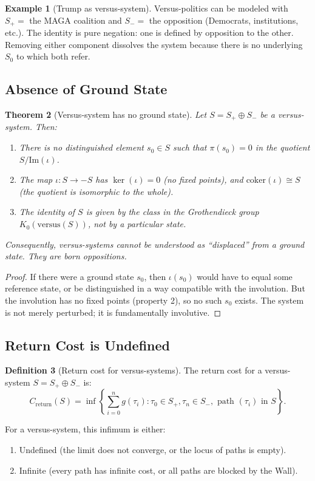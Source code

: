 \documentclass[12pt]{article}
\newtheorem{theorem}{Theorem}[section]
\theoremstyle{definition}
\newtheorem{definition}[theorem]{Definition}
\newtheorem{example}[theorem]{Example}
\theoremstyle{remark}
\begin{document}
\begin{example}[Trump as versus-system]
Versus-politics can be modeled with $S_+ = $ the MAGA coalition and $S_- = $ the opposition (Democrats, institutions, etc.). The identity is pure negation: one is defined by opposition to the other. Removing either component dissolves the system because there is no underlying $S_0$ to which both refer.
\end{example}

\subsection{Absence of Ground State}

\begin{theorem}[Versus-system has no ground state]
\label{thm:versus-no-ground}
Let $S = S_+ \oplus S_-$ be a versus-system. Then:
\begin{enumerate}
\item There is no distinguished element $s_0 \in S$ such that $\pi(s_0) = 0$ in the quotient $S / \text{Im}(\iota)$.
\item The map $\iota : S \to -S$ has $\ker(\iota) = 0$ (no fixed points), and $\mathrm{coker}(\iota) \cong S$ (the quotient is isomorphic to the whole).
\item The identity of $S$ is given by the class in the Grothendieck group $K_0(\mathrm{versus}(S))$, not by a particular state.
\end{enumerate}
Consequently, versus-systems cannot be understood as ``displaced'' from a ground state. They are born oppositions.
\end{theorem}

\begin{proof}
If there were a ground state $s_0$, then $\iota(s_0)$ would have to equal some reference state, or be distinguished in a way compatible with the involution. But the involution has no fixed points (property 2), so no such $s_0$ exists. The system is not merely perturbed; it is fundamentally involutive.
\end{proof}

\subsection{Return Cost is Undefined}

\begin{definition}[Return cost for versus-systems]
The return cost for a versus-system $S = S_+ \oplus S_-$ is:
\[
C_{\text{return}}(S) = \inf \left\{ \sum_{i=0}^n g(\tau_i) : \tau_0 \in S_+, \tau_n \in S_-, \text{ path } (\tau_i) \text{ in } S \right\}.
\]

For a versus-system, this infimum is either:
\begin{enumerate}
\item Undefined (the limit does not converge, or the locus of paths is empty).
\item Infinite (every path has infinite cost, or all paths are blocked by the Wall).
\end{enumerate}
\end{definition}
\end{document}
